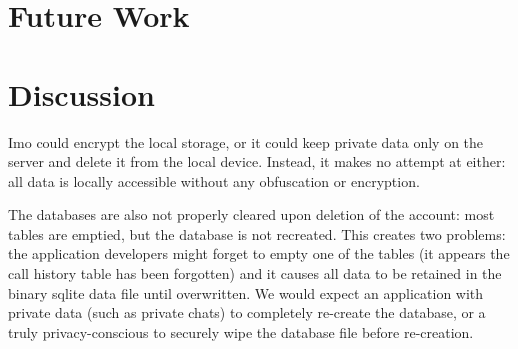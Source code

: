 \documentclass[conference]{IEEEtran}
\begin{document}
\section{Future Work}


%


%
%
%


\section{Discussion}


Imo could encrypt the local storage, or it could keep private data only on the
server and delete it from the local device. Instead, it makes no attempt at
either: all data is locally accessible without any obfuscation or encryption.

The databases are also not properly cleared upon deletion of the account: most
tables are emptied, but the database is not recreated. This creates two
problems: the application developers might forget to empty one of the tables
(it appears the call history table has been forgotten) and it causes all data
to be retained in the binary sqlite data file until overwritten. We would
expect an application with private data (such as private chats) to completely
re-create the database, or a truly privacy-conscious to securely wipe the
database file before re-creation.
\end{document}
